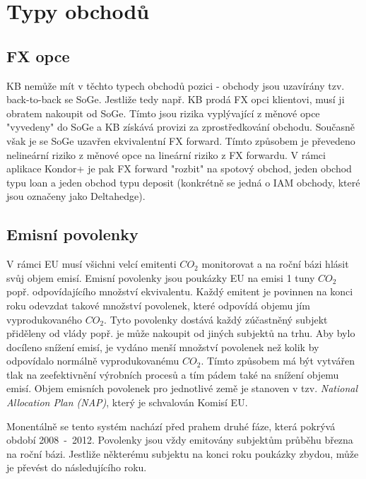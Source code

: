 \documentclass[a4paper]{book}
\begin{document}
\chapter{Typy obchodů}

\section{FX opce}

KB nemůže mít v těchto typech obchodů pozici - obchody jsou uzavírány tzv. back-to-back se SoGe. Jestliže tedy např. KB prodá FX opci klientovi, musí ji obratem nakoupit od SoGe. Tímto jsou rizika vyplývající z měnové opce "vyvedeny" do SoGe a KB získává provizi za zprostředkování obchodu. Současně však je se SoGe uzavřen ekvivalentní FX forward. Tímto způsobem je převedeno nelineární riziko z měnové opce na lineární riziko z FX forwardu. V rámci aplikace Kondor+ je pak FX forward "rozbit" na spotový obchod, jeden obchod typu loan a jeden obchod typu deposit (konkrétně se jedná o IAM obchody, které jsou označeny jako Deltahedge).

\section{Emisní povolenky}

V rámci EU musí všichni velcí emitenti $CO_2$ monitorovat a na roční bázi hlásit svůj objem emisí. Emisní povolenky jsou poukázky EU na emisi 1 tuny $CO_2$ popř. odpovídajícího množství ekvivalentu. Každý emitent je povinnen na konci roku odevzdat takové množství povolenek, které odpovídá objemu jím vyprodukovaného $CO_2$. Tyto povolenky dostává každý zúčastněný subjekt přiděleny od vlády popř. je může nakoupit od jiných subjektů na trhu. Aby bylo docíleno snížení emisí, je vydáno menší množství povolenek než kolik by odpovídalo normálně vyprodukovanému $CO_2$. Tímto způsobem má být vytvářen tlak na zeefektivnění výrobních procesů a tím pádem také na snížení objemu emisí. Objem emisních povolenek pro jednotlivé země je stanoven v tzv. \textit{National Allocation Plan (NAP)}, který je schvalován Komisí EU.

Monentálně se tento systém nachází před prahem druhé fáze, která pokrývá období 2008~-~2012. Povolenky jsou vždy emitovány subjektům průběhu března na roční bázi. Jestliže některému subjektu na konci roku poukázky zbydou, může je převést do následujícího roku.\\
\end{document}
